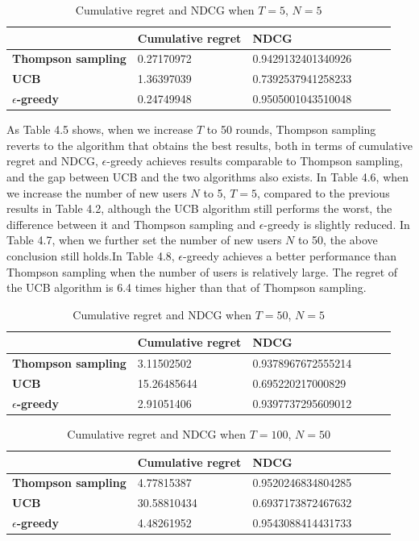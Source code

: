 \begin{table}[htbp]
\centering
\begin{tabular}{llllll}
\hline
                  & Cumulative regret & NDCG   \\ \hline
\textbf{Thompson sampling} &0.27170972               &   0.9429132401340926  \\
\textbf{UCB }              & 1.36397039 & 0.7392537941258233 \\
\textbf{$\epsilon$-greedy }& 0.24749948 &0.9505001043510048
\end{tabular}
\caption{Cumulative regret and NDCG when $T=5$, $N=5$}
\end{table}
As Table 4.5 shows, when we increase $T$ to 50 rounds, Thompson sampling reverts to the algorithm that obtains the best results, both in terms of cumulative regret and NDCG, $\epsilon$-greedy achieves results comparable to Thompson sampling, and the gap between UCB and the two algorithms also exists.
In Table 4.6, when we increase the number of new users $N$ to 5, $T=5$, compared to the previous results in Table 4.2, although the UCB algorithm still performs the worst, the difference between it and Thompson sampling and $\epsilon$-greedy is slightly reduced. In Table 4.7, when we further set the number of new users $N$ to 50, the above conclusion still holds.In Table 4.8, $\epsilon$-greedy achieves a better performance than Thompson sampling when the number of users is relatively large. The regret of the UCB algorithm is 6.4 times higher than that of Thompson sampling.
\begin{table}[htbp]
\centering
\begin{tabular}{llllll}
\hline
                  & Cumulative regret & NDCG   \\ \hline
\textbf{Thompson sampling} &3.11502502               &   0.9378967672555214  \\
\textbf{UCB }              & 15.26485644 & 0.695220217000829 \\
\textbf{$\epsilon$-greedy }& 2.91051406 &0.9397737295609012
\end{tabular}
\caption{Cumulative regret and NDCG when $T=50$, $N=5$}
\end{table}

\begin{table}[htbp]
\centering
\begin{tabular}{llllll}
\hline
                  & Cumulative regret & NDCG   \\ \hline
\textbf{Thompson sampling} &4.77815387               &   0.9520246834804285  \\
\textbf{UCB }              & 30.58810434 & 0.6937173872467632 \\
\textbf{$\epsilon$-greedy }& 4.48261952 &0.9543088414431733
\end{tabular}
\caption{Cumulative regret and NDCG when $T=100$, $N=50$}
\end{table}

